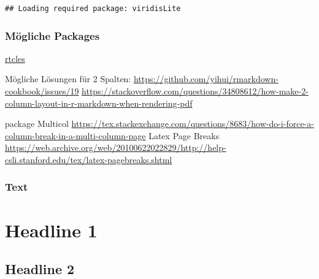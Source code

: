 \documentclass[
  twocolumn]{article}
\newenvironment{Shaded}{\begin{snugshade}}{\end{snugshade}}
\newcommand{\CommentTok}[1]{\textcolor[rgb]{0.56,0.35,0.01}{\textit{#1}}}
\newcommand{\KeywordTok}[1]{\textcolor[rgb]{0.13,0.29,0.53}{\textbf{#1}}}
\newcommand{\NormalTok}[1]{#1}
\newcommand{\OperatorTok}[1]{\textcolor[rgb]{0.81,0.36,0.00}{\textbf{#1}}}
\newcommand{\StringTok}[1]{\textcolor[rgb]{0.31,0.60,0.02}{#1}}
\begin{document}
\begin{verbatim}
## Loading required package: viridisLite
\end{verbatim}

\begin{Shaded}
\end{Shaded}

\twocolumn

\hypertarget{muxf6gliche-packages}{%
\subsubsection{Mögliche Packages}\label{muxf6gliche-packages}}

\href{https://github.com/rstudio/rticles}{rtcles}

Mögliche Lösungen für 2 Spalten:
\url{https://github.com/yihui/rmarkdown-cookbook/issues/19}
\url{https://stackoverflow.com/questions/34808612/how-make-2-column-layout-in-r-markdown-when-rendering-pdf}

package Multicol
\url{https://tex.stackexchange.com/questions/8683/how-do-i-force-a-column-break-in-a-multi-column-page}
Latex Page Breaks
\url{https://web.archive.org/web/20100622022829/http://help-csli.stanford.edu/tex/latex-pagebreaks.shtml}

\hypertarget{text}{%
\subsubsection{Text}\label{text}}

\hypertarget{headline-1}{%
\section{Headline 1}\label{headline-1}}

\hypertarget{headline-2}{%
\subsection{Headline 2}\label{headline-2}}
\end{document}

